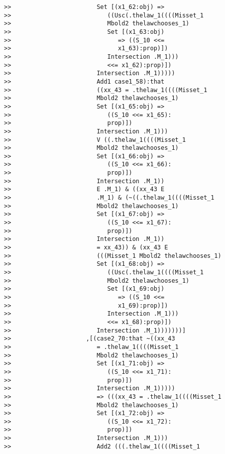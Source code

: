 \documentclass[12pt]{article}
\begin{document}
\begin{verbatim}
>>                        Set [(x1_62:obj) =>
>>                           ((Usc(.thelaw_1((((Misset_1
>>                           Mbold2 thelawchooses_1)
>>                           Set [(x1_63:obj)
>>                              => ((S_10 <<=
>>                              x1_63):prop)])
>>                           Intersection .M_1)))
>>                           <<= x1_62):prop)])
>>                        Intersection .M_1)))))
>>                        Add1 case1_58):that
>>                        ((xx_43 = .thelaw_1((((Misset_1
>>                        Mbold2 thelawchooses_1)
>>                        Set [(x1_65:obj) =>
>>                           ((S_10 <<= x1_65):
>>                           prop)])
>>                        Intersection .M_1)))
>>                        V ((.thelaw_1((((Misset_1
>>                        Mbold2 thelawchooses_1)
>>                        Set [(x1_66:obj) =>
>>                           ((S_10 <<= x1_66):
>>                           prop)])
>>                        Intersection .M_1))
>>                        E .M_1) & ((xx_43 E
>>                        .M_1) & (~((.thelaw_1((((Misset_1
>>                        Mbold2 thelawchooses_1)
>>                        Set [(x1_67:obj) =>
>>                           ((S_10 <<= x1_67):
>>                           prop)])
>>                        Intersection .M_1))
>>                        = xx_43)) & (xx_43 E
>>                        (((Misset_1 Mbold2 thelawchooses_1)
>>                        Set [(x1_68:obj) =>
>>                           ((Usc(.thelaw_1((((Misset_1
>>                           Mbold2 thelawchooses_1)
>>                           Set [(x1_69:obj)
>>                              => ((S_10 <<=
>>                              x1_69):prop)])
>>                           Intersection .M_1)))
>>                           <<= x1_68):prop)])
>>                        Intersection .M_1)))))))]
>>                     ,[(case2_70:that ~((xx_43
>>                        = .thelaw_1((((Misset_1
>>                        Mbold2 thelawchooses_1)
>>                        Set [(x1_71:obj) =>
>>                           ((S_10 <<= x1_71):
>>                           prop)])
>>                        Intersection .M_1)))))
>>                        => (((xx_43 = .thelaw_1((((Misset_1
>>                        Mbold2 thelawchooses_1)
>>                        Set [(x1_72:obj) =>
>>                           ((S_10 <<= x1_72):
>>                           prop)])
>>                        Intersection .M_1)))
>>                        Add2 (((.thelaw_1((((Misset_1

\end{verbatim}
\end{document}

